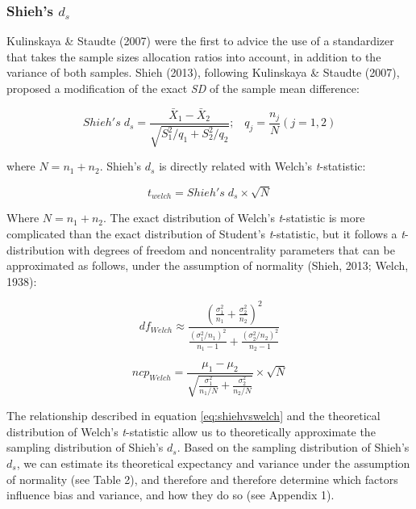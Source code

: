 \documentclass[
  man,floatsintext]{apa6}
\begin{document}
\hypertarget{shiehs-d_s}{%
\subsubsection{\texorpdfstring{Shieh's \(d_s\)}{Shieh's d\_s}}\label{shiehs-d_s}}

Kulinskaya \& Staudte (2007) were the first to advice the use of a standardizer that takes the sample sizes allocation ratios into account, in addition to the variance of both samples. Shieh (2013), following Kulinskaya \& Staudte (2007), proposed a modification of the exact \emph{SD} of the sample mean difference:

\begin{equation} 
Shieh's \; d_s = \frac{\bar{X}_1 - \bar{X}_2}{\sqrt{S_1^2/q_1+S_2^2/q_2}}; \;\;\; q_j=\frac{n_j}{N} (j=1,2)
\label{eq:Shiehds}
\end{equation}

where \(N = n_1+n_2\). Shieh's \(d_{s}\) is directly related with Welch's \emph{t}-statistic:

\begin{equation} 
t_{welch} = Shieh's \; d_s \times \sqrt{N}
\label{eq:shiehvswelch}
\end{equation}

Where \(N = n_1+n_2\). The exact distribution of Welch's \emph{t}-statistic is more complicated than the exact distribution of Student's \emph{t}-statistic, but it follows a \emph{t}-distribution with degrees of freedom and noncentrality parameters that can be approximated as follows, under the assumption of normality (Shieh, 2013; Welch, 1938):

\begin{equation} 
df_{Welch} \approx \frac{\left(\frac{\sigma^2_1}{n_1}+\frac{\sigma^2_2}{n_2} \right)^2}{\frac{(\sigma^2_1/n_1)^2}{n_1-1}+\frac{(\sigma^2_2/n_2)^2}{n_2-1}}
\label{eq:welchdf}
\end{equation}

\begin{equation} 
ncp_{Welch} = \frac{\mu_1-\mu_2}{\sqrt{\frac{\sigma_1^2}{n_1/N}+\frac{\sigma_2^2}{n_2/N}}} \times \sqrt{N}
\label{eq:welchncp}
\end{equation}

The relationship described in equation \ref{eq:shiehvswelch} and the theoretical distribution of Welch's \emph{t}-statistic allow us to theoretically approximate the sampling distribution of Shieh's \(d_s\). Based on the sampling distribution of Shieh's \(d_s\), we can estimate its theoretical expectancy and variance under the assumption of normality (see Table 2), and therefore and therefore determine which factors influence bias and variance, and how they do so (see Appendix 1).
\end{document}
